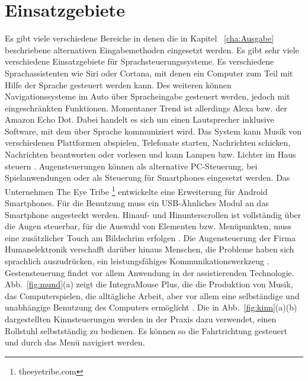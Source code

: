 \section{Einsatzgebiete}
%
%
Es gibt viele verschiedene Bereiche in denen die in Kapitel ~\ref{cha:Ausgabe} beschriebene alternativen Eingabemethoden eingesetzt werden.
\newline \newline
Es gibt sehr viele verschiedene Einsatzgebiete für Sprachsteuerungssysteme. Es verschiedene Sprachassistenten wie \zB Siri oder Cortana, mit denen ein Computer zum Teil mit Hilfe der Sprache gesteuert werden kann.
Des weiteren können Navigationssysteme im Auto über Spracheingabe gesteuert werden, jedoch mit eingeschränkten Funktionen. Momentaner Trend ist allerdings Alexa bzw. der Amazon Echo Dot. Dabei handelt es sich um einen Lautsprecher inklusive Software, mit dem über Sprache kommuniziert wird. Das System kann Musik von verschiedenen Plattformen abspielen, Telefonate starten, Nachrichten schicken, Nachrichten beantworten oder vorlesen und kann Lampen bzw. Lichter im Haus steuern \cite{Alexa}. 
\newline \newline \newline \newline
Augensteuerungen können als alternative PC-Steuerung, bei Spielanwendungen oder als Steuerung für Smartphones eingesetzt werden. Das Unternehmen The Eye Tribe%
\footnote{theeyetribe.com}
%
entwickelte eine Erweiterung für Android Smartphones. Für die Benutzung muss ein USB-Ähnliches Modul an das Smartphone angesteckt werden. Hinauf- und Hinunterscrollen ist vollständig über die Augen steuerbar, für die Auswahl von Elementen bzw. Menüpunkten, muss eine zusätzlicher Touch am Bildschrim erfolgen \cite{eyeTribe}. Die Augensteuerung der Firma Humanelektronik verschafft darüber hinaus Menschen, die Probleme haben sich sprachlich auszudrücken, ein leistungsfähiges Kommunikationswerkzeug \cite{SEETECH}.
\newline \newline
Gestensteuerung findet vor allem Anwendung in der assistierenden Technologie. Abb.~\ref{fig:mund}(a) zeigt die IntegraMouse Plus, die die Produktion von Musik, das Computerspielen, die alltägliche Arbeit, aber vor allem eine selbständige und unabhängige Benutzung des Computers ermöglicht \cite{INTEGRA_Stories}. Die in Abb.~\ref{fig:kinn}(a)(b) dargestellten Kinnsteuerungen werden in der Praxis dazu verwendet, einen Rollstuhl selbstständig zu bedienen. Es können so die Fahrtrichtung gesteuert und durch das Menü navigiert werden.
